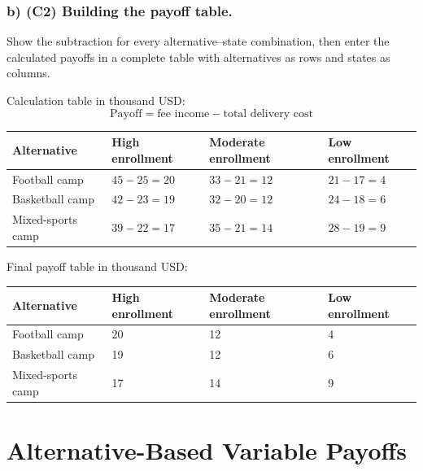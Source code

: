 \subsubsection*{b) \textbf{(C2)} Building the payoff table.}
\label{subsec:problem2-youth-sports-camp-c2}
Show the subtraction for every alternative--state combination, then enter the calculated payoffs in a complete table with alternatives as rows and states as columns.

Calculation table in thousand USD:
\[
\text{Payoff}=\text{fee income}-\text{total delivery cost}
\]
\begin{center}
\small
\begin{tabular}{llll}
\toprule
Alternative & High enrollment & Moderate enrollment & Low enrollment \\
\midrule
Football camp & $45 - 25 = 20$ & $33 - 21 = 12$ & $21 - 17 = 4$ \\
Basketball camp & $42 - 23 = 19$ & $32 - 20 = 12$ & $24 - 18 = 6$ \\
Mixed-sports camp & $39 - 22 = 17$ & $35 - 21 = 14$ & $28 - 19 = 9$ \\
\bottomrule
\end{tabular}
\end{center}

Final payoff table in thousand USD:
\begin{center}
\begin{tabular}{llll}
\toprule
Alternative & High enrollment & Moderate enrollment & Low enrollment \\
\midrule
Football camp & 20 & 12 & 4 \\
Basketball camp & 19 & 12 & 6 \\
Mixed-sports camp & 17 & 14 & 9 \\
\bottomrule
\end{tabular}
\end{center}
\section{Alternative-Based Variable Payoffs}
\label{sec:alternative-based-variable-payoffs}
